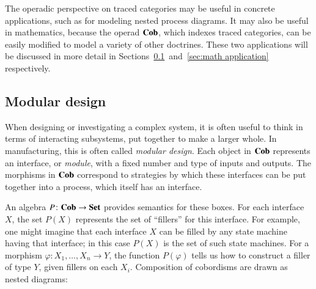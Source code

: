 \documentclass[12pt,oneside,article,draft]{memoir}
\begin{document}
The operadic perspective on traced categories may be useful in concrete applications, such as for modeling nested process diagrams. It may also be useful in mathematics, because the operad $\mathbf{Cob}$, which indexes traced categories, can be easily modified to model a variety of other doctrines. These two applications will be discussed in more detail in Sections~\ref{sec:modular}~and~\ref{sec:math application} respectively.

\subsection{Modular design}\label{sec:modular}

When designing or investigating a complex system, it is often useful to think in terms of interacting subsystems, put together to make a larger whole.
In manufacturing, this is often called \emph{modular design}.
Each object in $\mathbf{Cob}$ represents an interface, or \emph{module}, with a fixed number and type of inputs and outputs.
The morphisms in $\mathbf{Cob}$ correspond to strategies by which these interfaces can be put together into a process, which itself has an interface. 

An algebra $P\colon\mathbf{Cob}\to\mathbf{Set}$ provides semantics for these boxes.
For each interface $X$, the set $P(X)$ represents the set of ``fillers'' for this interface.
For example, one might imagine that each interface $X$ can be filled by any state machine having that interface; in this case $P(X)$ is the set of such state machines.
For a morphism $\varphi\colon X_1,\ldots,X_n\to Y$, the function $P(\varphi)$ tells us how to construct a filler of type $Y$, given fillers on each $X_i$.
Composition of cobordisms are drawn as nested diagrams:
\end{document}
